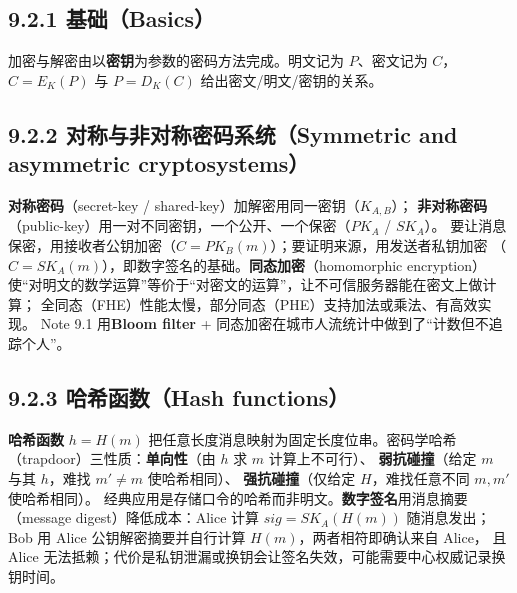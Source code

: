 \subsection*{9.2.1 基础（Basics）}
加密与解密由以\textbf{密钥}为参数的密码方法完成。明文记为 $P$、密文记为 $C$，
$C = E_K(P)$ 与 $P = D_K(C)$ 给出密文/明文/密钥的关系。

\begin{closeread}
\end{closeread}


\subsection*{9.2.2 对称与非对称密码系统（Symmetric and asymmetric cryptosystems）}
\textbf{对称密码}（secret-key / shared-key）加解密用同一密钥（$K_{A,B}$）；
\textbf{非对称密码}（public-key）用一对不同密钥，一个公开、一个保密（$PK_A$ / $SK_A$）。
要让消息保密，用接收者公钥加密（$C = PK_B(m)$）；要证明来源，用发送者私钥加密
（$C = SK_A(m)$），即数字签名的基础。\textbf{同态加密}（homomorphic encryption）
使“对明文的数学运算”等价于“对密文的运算”，让不可信服务器能在密文上做计算；
全同态（FHE）性能太慢，部分同态（PHE）支持加法或乘法、有高效实现。
Note 9.1 用\textbf{Bloom filter} + 同态加密在城市人流统计中做到了“计数但不追踪个人”。

\begin{closeread}
\end{closeread}


\subsection*{9.2.3 哈希函数（Hash functions）}
\textbf{哈希函数} $h = H(m)$ 把任意长度消息映射为固定长度位串。密码学哈希
（trapdoor）三性质：\textbf{单向性}（由 $h$ 求 $m$ 计算上不可行）、
\textbf{弱抗碰撞}（给定 $m$ 与其 $h$，难找 $m' \neq m$ 使哈希相同）、
\textbf{强抗碰撞}（仅给定 $H$，难找任意不同 $m, m'$ 使哈希相同）。
经典应用是存储口令的哈希而非明文。\textbf{数字签名}用消息摘要
（message digest）降低成本：Alice 计算 $sig = SK_A(H(m))$ 随消息发出；
Bob 用 Alice 公钥解密摘要并自行计算 $H(m)$，两者相符即确认来自 Alice，
且 Alice 无法抵赖；代价是私钥泄漏或换钥会让签名失效，可能需要中心权威记录换钥时间。

